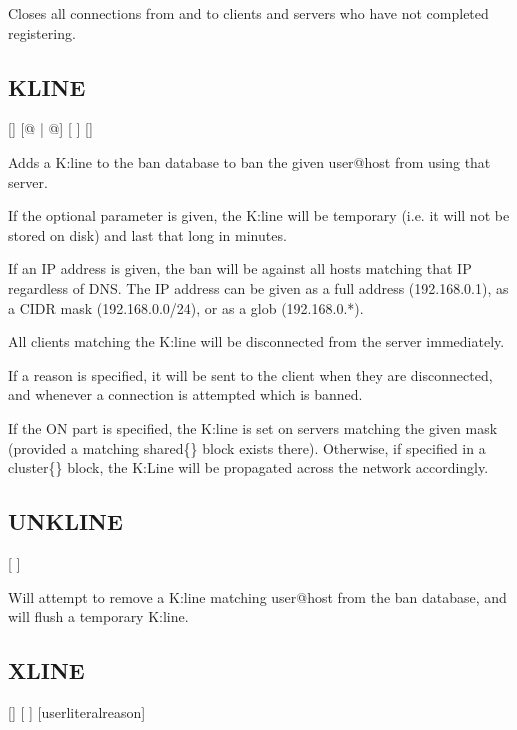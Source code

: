 	Closes all connections from and to clients and servers who have not
	completed registering.

\subsection{KLINE}

	[]
	[@ |
	 @]
	[ ] []

	Adds a K:line to the ban database to ban the given user@host from
	using that server.

	If the optional parameter  is given, the K:line will
	be temporary (i.e. it will not be stored on disk) and last that long in
	minutes.

	If an IP address is given, the ban will be against all hosts matching
	that IP regardless of DNS. The IP address can be given as a full
	address (192.168.0.1), as a CIDR mask (192.168.0.0\slash24), or as a
	glob (192.168.0.*).

	All clients matching the K:line will be disconnected from the server
	immediately.

	If a reason is specified, it will be sent to the client when they are
	disconnected, and whenever a connection is attempted which is banned.

	If the ON part is specified, the K:line is set on servers matching the
	given mask (provided a matching shared\{\} block exists there).
	Otherwise, if specified in a cluster\{\} block, the K:Line will be
	propagated across the network accordingly.

\subsection{UNKLINE}

	[ ]

	Will attempt to remove a K:line matching user@host from
	the ban database, and will flush a temporary K:line.

\subsection{XLINE}
\label{XLINES}

 []  [ ] [\literal{:}userliteral{reason}]

